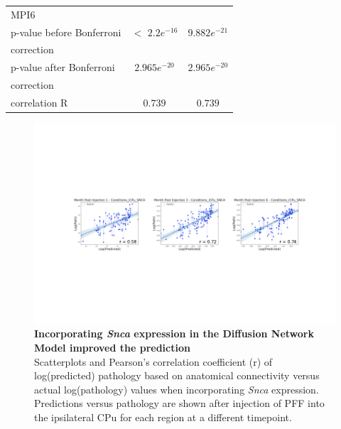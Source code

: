 \begin{table}[h!]
\begin{center}
\begin{tabular}{|l|c|c|}
      MPI6& &\\
            \hspace{1cm} p-value before Bonferroni & $<$ $2.2e^{-16}$ & $9.882e^{-21}$ \\ 
            \hspace{1cm} correction & &\\
            \hspace{1cm} p-value after Bonferroni & $2.965e^{-20}$ & $2.965e^{-20}$  \\ 
            \hspace{1cm} correction & &\\
            \hspace{1cm} correlation R & $0.739$ & $0.739$ \\
      \hline

      
    \end{tabular}
  \end{center}
\end{table}

\begin{figure}
    \hspace*{-2cm} 
    \hspace*{-2cm}
    \hspace*{-2cm}
    \hspace*{-1.5cm}
    \vspace*{-6cm}
    \includegraphics[scale=1.7]{Figures/Fig4.pdf}
    \caption{\textbf{Incorporating \textit{Snca} expression in the Diffusion Network Model improved the prediction} \\
    Scatterplots and Pearson's correlation coefficient (r) of log(predicted) pathology based on anatomical connectivity versus actual log(pathology) values when incorporating \textit{Snca} expression. Predictions versus pathology are shown after injection of PFF into the ipsilateral CPu for each region at a different timepoint.}
    \end{figure}

